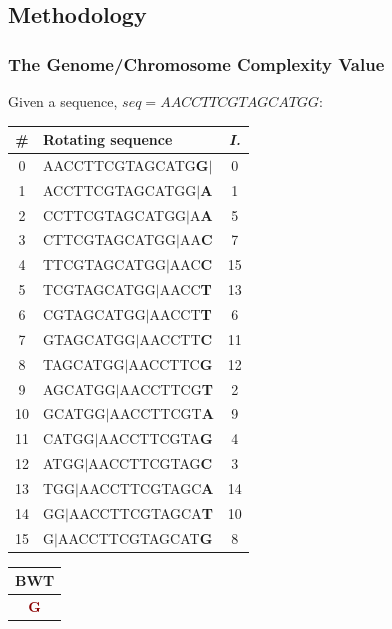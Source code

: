 \documentclass[hyperref={pagebackref=true},table]{beamer}
\begin{document}
\subsection{Methodology}

\begin{frame}
  \frametitle{The Genome/Chromosome Complexity Value}
\begin{table}[!ht]
  \scriptsize
  Given a sequence, $seq=AACCTTCGTAGCATGG$:
  \begin{center}
      \begin{tabular}{clc}
        \hline
        \textbf{\#} & \textbf{Rotating sequence} & \textbf{\textit{I.}} \\ \hline
        0  & AACCTTCGTAGCATG\textbf{G}$|$ & 0  \\
        1  & ACCTTCGTAGCATGG$|$\textbf{A} & 1  \\
        2  & CCTTCGTAGCATGG$|$A\textbf{A} & 5  \\
        3  & CTTCGTAGCATGG$|$AA\textbf{C} & 7  \\
        4  & TTCGTAGCATGG$|$AAC\textbf{C} & 15 \\
        5  & TCGTAGCATGG$|$AACC\textbf{T} & 13 \\
        6  & CGTAGCATGG$|$AACCT\textbf{T} & 6  \\
        7  & GTAGCATGG$|$AACCTT\textbf{C} & 11 \\
        8  & TAGCATGG$|$AACCTTC\textbf{G} & 12 \\
        9  & AGCATGG$|$AACCTTCG\textbf{T} & 2  \\
        10 & GCATGG$|$AACCTTCGT\textbf{A} & 9  \\
        11 & CATGG$|$AACCTTCGTA\textbf{G} & 4  \\
        12 & ATGG$|$AACCTTCGTAG\textbf{C} & 3  \\
        13 & TGG$|$AACCTTCGTAGC\textbf{A} & 14 \\
        14 & GG$|$AACCTTCGTAGCA\textbf{T} & 10 \\
        15 & G$|$AACCTTCGTAGCAT\textbf{G} & 8  \\ \hline
      \end{tabular}
    {\Large\pointer}
      \begin{tabular}{ c }
        \hline
        \textbf{BWT}                             \\ \hline
        \textcolor{darkred}{\textbf{G}}          \\

\end{tabular}
\end{center}
\end{table}
\end{frame}
\end{document}

